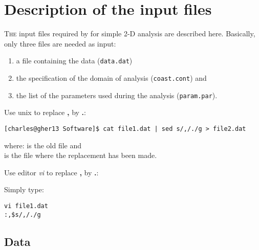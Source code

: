 \chapter{Description of the input files\label{chap:general}}

\lettrine[lines=2, loversize=0.0, lraise=0.5]{T}{he} input files required by \diva for simple 2-D analysis are described here. 
Basically, only three files are needed as input:

\begin{enumerate}
\item a file containing the data (\texttt{data.dat})
\item the specification of the domain of analysis (\texttt{coast.cont}) and 
\item the list of the parameters used during the analysis (\texttt{param.par}).
\end{enumerate}


\minitoc

\newpage %


\begin{center}
\end{center}


\btips
Use unix  to replace \textbf{,} by \textbf{.}:
\begin{lstlisting}[style=Bash]
[charles@gher13 Software]$ cat file1.dat | sed s/,/./g > file2.dat
\end{lstlisting}

where:  is the old file and \\
\hphantom{where:}  is the file where the replacement has been made.
\etips


\btips
Use editor \textsl{vi} to replace \textbf{,} by \textbf{.}:

Simply type:
\begin{verbatim}
vi file1.dat
:,$s/,/./g
\end{verbatim}
\etips

\section{Data}

